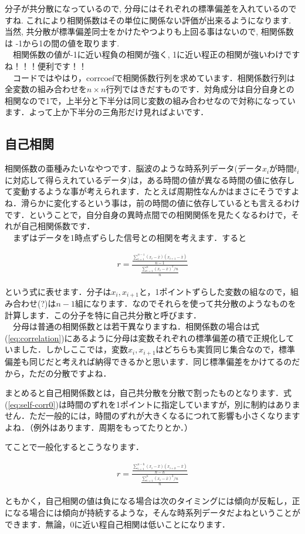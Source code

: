 \documentclass[11pt,a4paper]{ujreport}
\begin{document}
分子が共分散になっているので, 分母にはそれぞれの標準偏差を入れているのですね. これにより相関係数はその単位に関係ない評価が出来るようになります. 当然, 共分散が標準偏差同士をかけたやつよりも上回る事はないので, 相関係数は -1から1の間の値を取ります.\\
　相関係数の値が-1に近い程負の相関が強く, 1に近い程正の相関が強いわけですね！！！便利です！！\\
　コードではやはり，corrcoefで相関係数行列を求めています．相関係数行列は全変数の組み合わせを$n \times n$行列ではきだすものです．対角成分は自分自身との相関なので1で，上半分と下半分は同じ変数の組み合わせなので対称になっています．よって上か下半分の三角形だけ見ればよいです．

\subsection{自己相関}
相関係数の亜種みたいなやつです．脳波のような時系列データ(データ$x_i$が時間$t_i$に対応して得らえれているデータ)は，ある時間の値が異なる時間の値に依存して変動するような事が考えられます．たとえば周期性なんかはまさにそうですよね．滑らかに変化するという事は，前の時間の値に依存しているとも言えるわけです．ということで，自分自身の異時点間での相関関係を見たくなるわけで，それが自己相関係数です．\\

　まずはデータを1時点ずらした信号との相関を考えます．すると

\begin{eqnarray}
\label{eq:self-corr0}
r = \frac{\frac{\sum_{i=1}^{n-1} (x_i-\bar x)(x_{i+1} - \bar x)}{n-1}}{\frac{\sum_{i=1}^n (x_i - \bar x)^2 /n}{n}}
\end{eqnarray}

という式に表せます．分子は$x_i, x_{i+1}$と，1ポイントずらした変数の組なので，組み合わせ(?)は$n-1$組になります．なのでそれらを使って共分散のようなものを計算します．この分子を特に自己共分散と呼びます．\\
　分母は普通の相関係数とは若干異なりますね．相関係数の場合は式(\ref{eq:correlation})にあるように分母は変数それぞれの標準偏差の積で正規化していました．しかしここでは，変数$x_i, x_{i+1}$はどちらも実質同じ集合なので，標準偏差も同じだと考えれば納得できるかと思います．同じ標準偏差をかけてるのだから，ただの分散ですよね．

まとめると自己相関係数とは，自己共分散を分散で割ったものとなります．式(\ref{eq:self-corr0})は時間のずれを1ポイントに指定していますが，別に制約はありません．ただ一般的には，時間のずれが大きくなるにつれて影響も小さくなりますよね．（例外はあります．周期をもってたりとか．）

てことで一般化するとこうなります．

\begin{eqnarray}
\label{eq:self-corr}
r = \frac{\frac{\sum_{i=1}^{n-h} (x_i-\bar x)(x_{i+h} - \bar x)}{n-h}}{\frac{\sum_{i=1}^n (x_i - \bar x)^2 /n}{n}}
\end{eqnarray}

ともかく，自己相関の値は負になる場合は次のタイミングには傾向が反転し，正になる場合には傾向が持続するような，そんな時系列データだよねということができます．無論，0に近い程自己相関は低いことになります．\\
\end{document}
